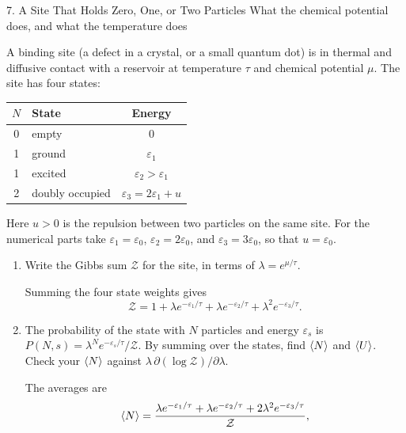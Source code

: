 \documentclass[11pt]{article}
\begin{document}
\begin{problem}{7. A Site That Holds Zero, One, or Two Particles}
What the chemical potential does, and what the temperature does

A binding site (a defect in a crystal, or a small quantum dot) is in thermal and diffusive contact with a reservoir at temperature \(\tau\) and chemical potential \(\mu\).
The site has four states:
\begin{center}
  \begin{tabular}{clc}
    \hline
    \(N\) & State & Energy \\
    \hline
    0 & empty & 0 \\
    1 & ground & \(\varepsilon_1\) \\
    1 & excited & \(\varepsilon_2>\varepsilon_1\) \\
    2 & doubly occupied & \(\varepsilon_3=2\varepsilon_1+u\) \\
    \hline
  \end{tabular}
\end{center}
Here \(u>0\) is the repulsion between two particles on the same site.
For the numerical parts take \(\varepsilon_1=\varepsilon_0\), \(\varepsilon_2=2\varepsilon_0\), and \(\varepsilon_3=3\varepsilon_0\), so that \(u=\varepsilon_0\).
\begin{enumerate}[label=(\alph*)]
  \item Write the Gibbs sum \(\mathcal{Z}\) for the site, in terms of \(\lambda=e^{\mu/\tau}\).
  \begin{answer}
Summing the four state weights gives
\begin{equation}
\label{eq:p7-gibbs}
\boxed{\mathcal Z=1+\lambda e^{-\varepsilon_1/\tau}
+\lambda e^{-\varepsilon_2/\tau}+\lambda^2e^{-\varepsilon_3/\tau}}.
\end{equation}
\end{answer}
\item The probability of the state with \(N\) particles and energy \(\varepsilon_s\) is \(P(N,s)=\lambda^N e^{-\varepsilon_s/\tau}/\mathcal{Z}\).
  By summing over the states, find \(\ev{N}\) and \(\ev{U}\).
  Check your \(\ev{N}\) against \(\lambda\,\partial(\log\mathcal{Z})/\partial\lambda\).
  \begin{answer}
The averages are
\begin{equation}
\label{eq:p7-averages}
\begin{aligned}
\ev N&=\frac{\lambda e^{-\varepsilon_1/\tau}+\lambda e^{-\varepsilon_2/\tau}
+2\lambda^2e^{-\varepsilon_3/\tau}}{\mathcal Z},\\

\end{aligned}
\end{equation}
\end{answer}
\end{enumerate}
\end{problem}
\end{document}
